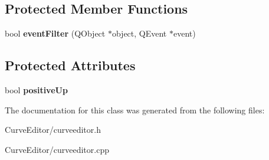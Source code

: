 \subsection*{\-Protected \-Member \-Functions}
\begin{DoxyCompactItemize}
\item 
\hypertarget{class_curve_editor_acef2db3156e9131f42d4a0288a611269}{
bool {\bfseries event\-Filter} (\-Q\-Object $\ast$object, \-Q\-Event $\ast$event)}
\label{class_curve_editor_acef2db3156e9131f42d4a0288a611269}

\end{DoxyCompactItemize}
\subsection*{\-Protected \-Attributes}
\begin{DoxyCompactItemize}
\item 
\hypertarget{class_curve_editor_adaedf9df699e4ce58adbfb8d98bd8265}{
bool {\bfseries positive\-Up}}
\label{class_curve_editor_adaedf9df699e4ce58adbfb8d98bd8265}

\end{DoxyCompactItemize}


\-The documentation for this class was generated from the following files\-:\begin{DoxyCompactItemize}
\item 
\-Curve\-Editor/curveeditor.\-h\item 
\-Curve\-Editor/curveeditor.\-cpp\end{DoxyCompactItemize}
